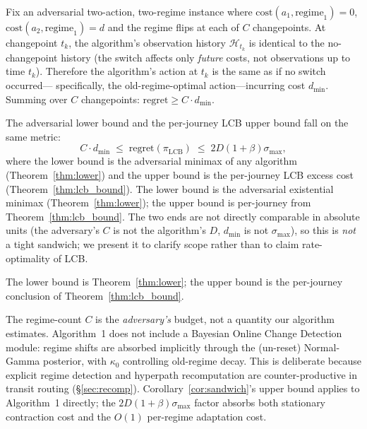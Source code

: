 \documentclass[opre,dblanonrev]{informs4}
\renewenvironment{proof}{\Trivlist\item[\hspace*{1em}\hskip\labelsep{\itshape Proof.\enskip}]\ignorespaces}{\endTrivlist\addvspace{0pt}}
\begin{document}
\begin{proof}
Fix an adversarial two-action, two-regime instance where
$\mathrm{cost}(a_1, \text{regime}_1) = 0$, $\mathrm{cost}(a_2, \text{regime}_1) = d$
and the regime flips at each of $C$ changepoints.
At changepoint $t_k$, the algorithm's observation history $\mathcal{H}_{t_k}$
is identical to the no-changepoint history (the switch affects only
\emph{future} costs, not observations up to time $t_k$).
Therefore the algorithm's action at $t_k$ is the same as if no switch occurred---
specifically, the old-regime-optimal action---incurring cost $d_{\min}$.
Summing over $C$ changepoints: $\mathrm{regret} \geq C \cdot d_{\min}$.
\end{proof}

\begin{corollary}\label{cor:sandwich}
The adversarial lower bound and the per-journey LCB upper bound
fall on the same metric:
\[
C \cdot d_{\min}
\;\leq\;
\mathrm{regret}(\pi_{\mathrm{LCB}})
\;\leq\;
2 D (1{+}\beta)\sigma_{\max},
\]
where the lower bound is the adversarial minimax of any
algorithm (Theorem~\ref{thm:lower}) and the upper bound is the
per-journey LCB excess cost (Theorem~\ref{thm:lcb_bound}).
The lower bound is the adversarial existential minimax
(Theorem~\ref{thm:lower}); the upper bound is per-journey from
Theorem~\ref{thm:lcb_bound}. The two ends are not directly
comparable in absolute units (the adversary's $C$ is not the
algorithm's $D$, $d_{\min}$ is not $\sigma_{\max}$), so this is
\emph{not} a tight sandwich; we present it to clarify scope rather
than to claim rate-optimality of LCB.
\end{corollary}

\begin{proof}
The lower bound is Theorem~\ref{thm:lower}; the upper bound is
the per-journey conclusion of Theorem~\ref{thm:lcb_bound}.
\end{proof}

\begin{remark}\label{rem:no-bocd}
The regime-count $C$ is the \emph{adversary's} budget, not a
quantity our algorithm estimates. Algorithm~1 does not include a
Bayesian Online Change Detection module: regime shifts are absorbed
implicitly through the (un-reset) Normal-Gamma posterior, with
$\kappa_0$ controlling old-regime decay. This is deliberate
because explicit regime detection and hyperpath recomputation are
counter-productive in transit routing
(\S\ref{sec:recomp}). Corollary~\ref{cor:sandwich}'s upper bound
applies to Algorithm~1 directly; the
$2D(1{+}\beta)\sigma_{\max}$ factor absorbs both stationary
contraction cost and the $O(1)$ per-regime adaptation cost.
\end{remark}
\end{document}
